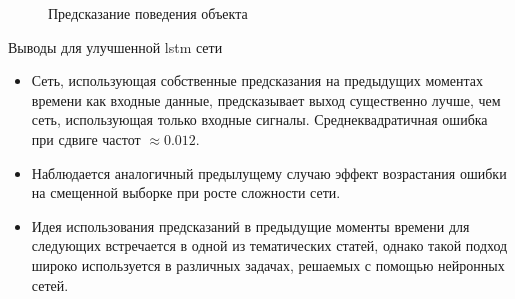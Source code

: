 \documentclass{beamer}
\begin{document}
\begin{frame}
\begin{figure}[!ht]
     \hfill
     \caption{Предсказание поведения объекта}
     \label{fig:dummy}
\end{figure}
\end{frame}

\begin{frame}{Выводы для улучшенной lstm сети}
\begin{itemize}
\item Сеть, использующая собственные предсказания на предыдущих моментах времени как входные данные, предсказывает выход существенно лучше, чем сеть, использующая только входные сигналы. Среднеквадратичная ошибка при сдвиге частот $\approx 0.012$.
\item Наблюдается аналогичный предылущему случаю эффект возрастания ошибки на смещенной выборке при росте сложности сети.
\item Идея использования предсказаний в предыдущие моменты времени для следующих встречается в одной из тематических статей, однако такой подход широко используется в различных задачах, решаемых с помощью нейронных сетей.
\end{itemize}
\end{frame}
\end{document}

